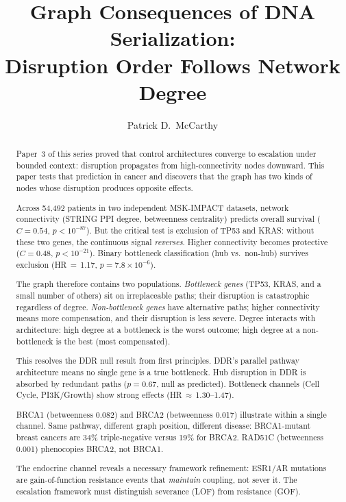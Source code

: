 \documentclass[11pt]{article}
\title{Graph Consequences of DNA Serialization:\\
Disruption Order Follows Network Degree}
\author{Patrick D.\ McCarthy}
\date{}
\begin{document}
\maketitle

\begin{abstract}
Paper~3 of this series proved that control architectures converge
to escalation under bounded context: disruption propagates from
high-connectivity nodes downward. This paper tests that prediction
in cancer and discovers that the graph has two kinds of nodes whose
disruption produces opposite effects.

Across 54{,}492 patients in two independent MSK-IMPACT datasets,
network connectivity (STRING PPI degree, betweenness centrality)
predicts overall survival ($C = 0.54$, $p < 10^{-87}$). But
the critical test is exclusion of TP53 and KRAS: without these
two genes, the continuous signal \emph{reverses}. Higher
connectivity becomes protective ($C = 0.48$, $p < 10^{-21}$).
Binary bottleneck classification (hub vs.\ non-hub) survives
exclusion (HR\,$=$\,1.17, $p = 7.8 \times 10^{-6}$).

The graph therefore contains two populations. \emph{Bottleneck
genes} (TP53, KRAS, and a small number of others) sit on
irreplaceable paths; their disruption is catastrophic regardless
of degree. \emph{Non-bottleneck genes} have alternative paths;
higher connectivity means more compensation, and their disruption
is less severe. Degree interacts with architecture: high degree at
a bottleneck is the worst outcome; high degree at a non-bottleneck
is the best (most compensated).

This resolves the DDR null result from first principles. DDR's
parallel pathway architecture means no single gene is a true
bottleneck. Hub disruption in DDR is absorbed by redundant paths
($p = 0.67$, null as predicted). Bottleneck channels (Cell Cycle,
PI3K/Growth) show strong effects (HR\,$\approx$\,1.30--1.47).

BRCA1 (betweenness 0.082) and BRCA2 (betweenness 0.017)
illustrate within a single channel. Same pathway, different
graph position, different disease: BRCA1-mutant breast cancers
are 34\% triple-negative versus 19\% for BRCA2. RAD51C
(betweenness 0.001) phenocopies BRCA2, not BRCA1.

The endocrine channel reveals a necessary framework refinement:
ESR1/AR mutations are gain-of-function resistance events that
\emph{maintain} coupling, not sever it. The escalation framework
must distinguish severance (LOF) from resistance (GOF).
\end{abstract}
\end{document}
